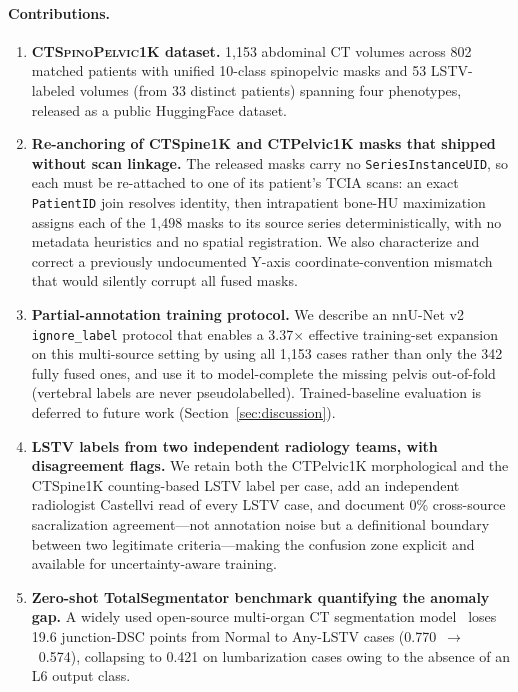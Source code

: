 \documentclass[pmlr]{jmlr}
\newcommand{\dataset}{\textsc{CTSpinoPelvic1K}}
\begin{document}
\paragraph{Contributions.}
\begin{enumerate}
  \item \textbf{\dataset{} dataset.} 1{,}153 abdominal CT volumes
    across 802 matched patients with unified 10-class spinopelvic
    masks and 53 LSTV-labeled volumes (from 33 distinct patients)
    spanning four phenotypes, released as a public HuggingFace
    dataset.
  \item \textbf{Re-anchoring of CTSpine1K and CTPelvic1K masks that
    shipped without scan linkage.} The released masks carry no
    \texttt{SeriesInstanceUID}, so each must be re-attached to one
    of its patient's TCIA scans: an exact \texttt{PatientID} join
    resolves identity, then intrapatient bone-HU maximization
    assigns each of the 1{,}498 masks to its source series
    deterministically, with no metadata heuristics and no spatial
    registration. We also characterize and correct a previously
    undocumented Y-axis coordinate-convention mismatch that would
    silently corrupt all fused masks.
  \item \textbf{Partial-annotation training protocol.}
    We describe an nnU-Net v2 \texttt{ignore\_label} protocol that
    enables a 3.37$\times$ effective training-set expansion on this
    multi-source setting by using all 1{,}153 cases rather than
    only the 342 fully fused ones, and use it to model-complete the
    missing pelvis out-of-fold (vertebral labels are never
    pseudolabelled). Trained-baseline evaluation is deferred to
    future work (Section~\ref{sec:discussion}).
  \item \textbf{LSTV labels from two independent radiology teams,
    with disagreement flags.} We retain both the CTPelvic1K
    morphological and the CTSpine1K counting-based LSTV label per
    case, add an independent radiologist Castellvi read of every
    LSTV case, and document 0\% cross-source sacralization
    agreement---not annotation noise but a definitional boundary
    between two legitimate criteria---making the confusion zone
    explicit and available for uncertainty-aware training.
  \item \textbf{Zero-shot TotalSegmentator benchmark quantifying
    the anomaly gap.} A widely used open-source multi-organ CT
    segmentation model~\citep{Wasserthal2023TotalSegmentator:Images}
    loses 19.6 junction-DSC points from Normal to Any-LSTV cases
    (0.770~$\rightarrow$~0.574), collapsing to 0.421 on
    lumbarization cases owing to the absence of an L6 output class.
\end{enumerate}
\end{document}
